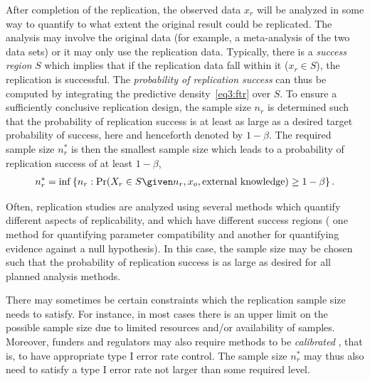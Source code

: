 After completion of the replication, the observed data $x_r$ will be analyzed in
some way to quantify to what extent the original result could be replicated. The
analysis may involve the original data (for example, a meta-analysis of the two
data sets) or it may only use the replication data. Typically, there is a
\emph{success region} $S$ which implies that if the replication data fall within
it ($x_r \in S$), the replication is successful. The \emph{probability of
  replication success} can thus be computed by integrating the predictive
density~\eqref{eq3:ftr} over $S$. To ensure a sufficiently conclusive replication
design, the sample size $n_{r}$ is determined such that the probability of
replication success is at least as large as a desired target probability of
success, here and henceforth denoted by $1 - \beta$. The required sample size
$n_r^*$ is then the smallest sample size which leads to a probability of
replication success of at least $1 - \beta$, \ie{}
\begin{align}
  \label{eq3:nr}
  n_r^* = \inf \left\{n_r : \Pr(X_{r} \in S \given
  n_r, x_{o}, \text{external knowledge}) \geq 1 - \beta \right\}.
\end{align}

Often, replication studies are analyzed using several methods which quantify
different aspects of replicability, and which have different success regions
(\eg{} one method for quantifying parameter compatibility and another for
quantifying evidence against a null hypothesis). In this case, the sample size
may be chosen such that the probability of replication success is as large as
desired for all planned analysis methods.

There may sometimes be certain constraints which the replication sample size
needs to satisfy. For instance, in most cases there is an upper limit on the
possible sample size due to limited resources and/or availability of samples.
Moreover, funders and regulators may also require methods to be
\emph{calibrated} \citep{Grieve2016}, that is, to have appropriate type I error
rate control. The sample size $n_r^*$ may thus also need to satisfy a type I
error rate not larger than some required level.






